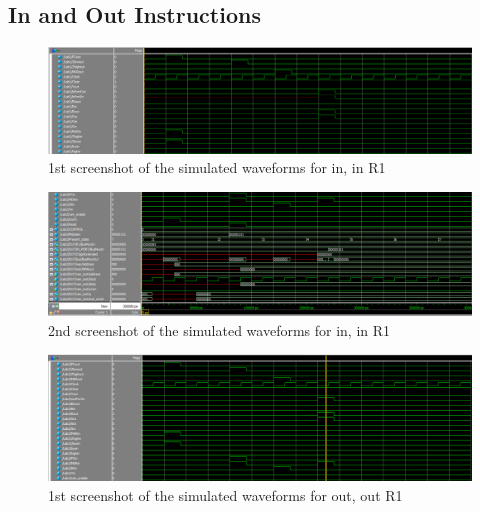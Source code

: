 \documentclass{article}
\begin{document}
    \subsection{In and Out Instructions}
                
        \begin{figure}[h!]
            \begin{center}
                \includegraphics[width=15cm]{in_wave_top_half.png}
                \caption{1st screenshot of the simulated waveforms for in, in R1}
            \end{center}
        \end{figure}

        \begin{figure}[h!]
            \begin{center}
                \includegraphics[width=15cm]{in_wave_bottom_half.png}
                \caption{2nd screenshot of the simulated waveforms for in, in R1}
            \end{center}
        \end{figure}
        
        \begin{figure}[h!]
            \begin{center}
                \includegraphics[width=15cm]{out_wave_top_half.png}
                \caption{1st screenshot of the simulated waveforms for out, out R1}
            \end{center}
        \end{figure}
\end{document}
